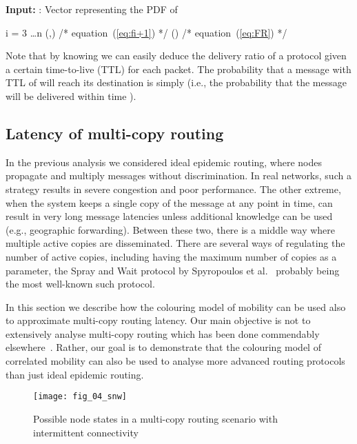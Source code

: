 \documentclass{article}
\newcommand{\assign}{ }
\begin{document}
\begin{algfig}[t]
{\bf Input:}  : Vector representing the PDF of 
\begin{codebox}
  \li  \assign 
  \li {} i = 3 \ldots n
  \li \>  \assign {}(,) \>\>\>\>\>\>\>\>/* equation~(\ref{eq:fi+1}) */
  \li  \assign {}()  
  \li  \assign  \>\>\>\>\>\>\>\>\> /* equation~(\ref{eq:FR}) */
  \li {} 
  \end{codebox}
  \caption{GetRoutingLatencyDistribution}
  \label{alg:getR}
\end{algfig}

Note that by knowing  we can easily deduce the delivery ratio of a
protocol given a certain time-to-live (TTL) for each packet. The
probability that a message with TTL of  will reach its destination
is simply  (i.e., the probability that the message will be
delivered within time ).

\subsection{Latency of multi-copy routing}
\label{sec:multicopymodel}
In the previous analysis we considered ideal epidemic routing, where
nodes propagate and multiply messages without discrimination. In real
networks, such a strategy results in severe congestion and poor
performance. The other extreme, when the system keeps a single copy of
the message at any point in time, can result in very long message
latencies unless additional knowledge can be used (e.g., geographic
forwarding). Between these two, there is a middle way where multiple
active copies are disseminated.  There are several ways of regulating
the number of active copies, including having the maximum number of
copies as a parameter, the Spray and Wait protocol by Spyropoulos et
al.~\cite{spyropoulos05} probably being the most well-known such
protocol.

In this section we describe how the colouring model of mobility can be
used also to approximate multi-copy routing latency. Our main
objective is not to extensively analyse multi-copy routing which has
been done commendably elsewhere~\cite{spyropoulos08multi}. Rather, our
goal is to demonstrate that the colouring model of correlated mobility
can also be used to analyse more advanced routing protocols than just
ideal epidemic routing. 

\begin{figure}[ht]
  \centering
  \texttt{[image: fig\_04\_snw]}
  \caption{Possible node states in a multi-copy routing scenario with intermittent connectivity}
  \label{fig:snw}
\end{figure}
\end{document}

